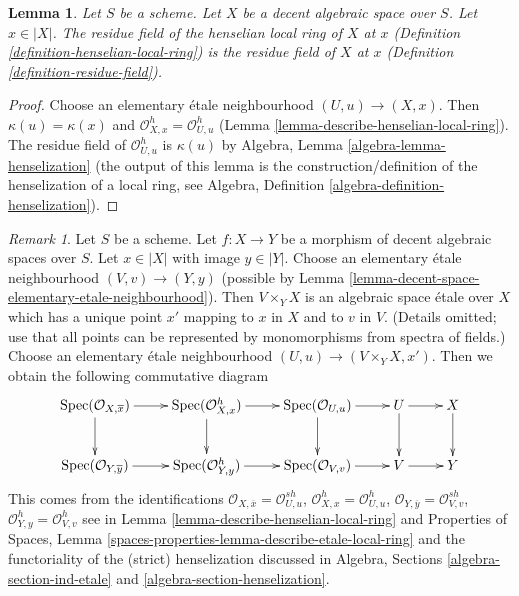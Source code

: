 \documentclass{stacks-project}
\theoremstyle{plain}
\newtheorem{lemma}[subsection]{Lemma}
\theoremstyle{definition}
\theoremstyle{remark}
\newtheorem{remark}[subsection]{Remark}
\numberwithin{equation}{subsection}
\def\Spec{\mathop{\mathrm{Spec}}}
\begin{document}
\begin{lemma}
\label{lemma-residue-field-henselian-local-ring}
Let $S$ be a scheme. Let $X$ be a decent algebraic space over $S$.
Let $x \in |X|$. The residue field of the
henselian local ring of $X$ at $x$
(Definition \ref{definition-henselian-local-ring})
is the residue field of $X$ at $x$
(Definition \ref{definition-residue-field}).
\end{lemma}

\begin{proof}
Choose an elementary \'etale neighbourhood $(U, u) \to (X, x)$.
Then $\kappa(u) = \kappa(x)$ and
$\mathcal{O}_{X, x}^h = \mathcal{O}_{U, u}^h$
(Lemma \ref{lemma-describe-henselian-local-ring}).
The residue field of $\mathcal{O}_{U, u}^h$
is $\kappa(u)$ by Algebra, Lemma \ref{algebra-lemma-henselization}
(the output of this lemma is the construction/definition
of the henselization of a local ring, see
Algebra, Definition \ref{algebra-definition-henselization}).
\end{proof}

\begin{remark}
\label{remark-functoriality-henselian-local-ring}
Let $S$ be a scheme. Let $f : X \to Y$ be a morphism of decent algebraic spaces
over $S$. Let $x \in |X|$ with image $y \in |Y|$. Choose an elementary
\'etale neighbourhood $(V, v) \to (Y, y)$ (possible by
Lemma \ref{lemma-decent-space-elementary-etale-neighbourhood}).
Then $V \times_Y X$ is an algebraic space \'etale over $X$
which has a unique point $x'$ mapping to $x$ in $X$ and to $v$ in $V$.
(Details omitted; use that all points can be represented by
monomorphisms from spectra of fields.)
Choose an elementary \'etale neighbourhood $(U, u) \to (V \times_Y X, x')$.
Then we obtain the following commutative diagram
$$
\xymatrix{
\Spec(\mathcal{O}_{X, \overline{x}}) \ar[r] \ar[d] &
\Spec(\mathcal{O}_{X, x}^h) \ar[r] \ar[d] &
\Spec(\mathcal{O}_{U, u}) \ar[r] \ar[d] &
U \ar[r] \ar[d] &
X \ar[d] \\
\Spec(\mathcal{O}_{Y, \overline{y}}) \ar[r] &
\Spec(\mathcal{O}_{Y, y}^h) \ar[r] &
\Spec(\mathcal{O}_{V, v}) \ar[r] &
V \ar[r] &
Y
}
$$
This comes from the identifications
$\mathcal{O}_{X, \overline{x}} = \mathcal{O}_{U, u}^{sh}$,
$\mathcal{O}_{X, x}^h = \mathcal{O}_{U, u}^h$,
$\mathcal{O}_{Y, \overline{y}} = \mathcal{O}_{V, v}^{sh}$,
$\mathcal{O}_{Y, y}^h = \mathcal{O}_{V, v}^h$
see in
Lemma \ref{lemma-describe-henselian-local-ring}
and
Properties of Spaces, Lemma
\ref{spaces-properties-lemma-describe-etale-local-ring}
and the functoriality of the (strict) henselization
discussed in Algebra, Sections \ref{algebra-section-ind-etale} and
\ref{algebra-section-henselization}.
\end{remark}
\end{document}
